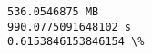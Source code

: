 \documentclass[11pt]{article}
\begin{document}
    \begin{Verbatim}[commandchars=\\\{\}]
536.0546875 MB
990.0775091648102 s
0.6153846153846154 \%

    \end{Verbatim}

    \begin{center}
    \end{center}
    { \hspace*{\fill} \\}
    

    
    
    
    
\end{document}
